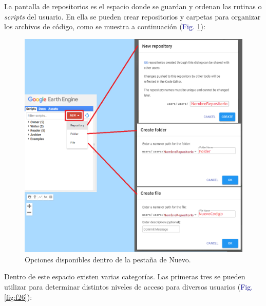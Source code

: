 \documentclass[
  12pt,
  letterpaper,
  twoside]{book}
\begin{document}
La pantalla de repositorios es el espacio donde se guardan y ordenan las rutinas o \emph{scripts} del usuario. En ella se pueden crear repositorios y carpetas para organizar los archivos de código, como se muestra a continuación (\textcolor{darkblue}{Fig.} \ref{fig:f25}):

\begin{figure}[H]

{\centering \includegraphics[width=0.8\linewidth]{Img/repofolderfile} 

}

\caption{Opciones disponibles dentro de la pestaña de Nuevo.}\label{fig:f25}
\end{figure}

Dentro de este espacio existen varias categorías. Las primeras tres se pueden utilizar para determinar distintos niveles de acceso para diversos usuarios (\textcolor{darkblue}{Fig.} \ref{fig:f26}):
\end{document}
